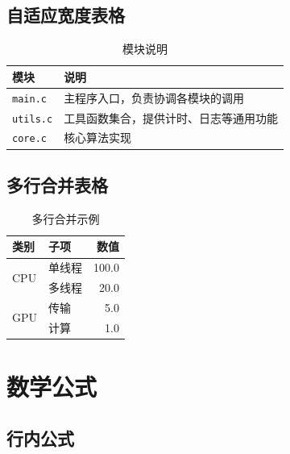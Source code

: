 \subsection{自适应宽度表格}

\begin{table}[H]
    \centering
    \caption{模块说明}
    \label{tab:modules}
    \begin{tabularx}{\textwidth}{lY}
        \toprule
        \textbf{模块} & \textbf{说明} \\
        \midrule
        \texttt{main.c}   & 主程序入口，负责协调各模块的调用 \\
        \texttt{utils.c}   & 工具函数集合，提供计时、日志等通用功能 \\
        \texttt{core.c}    & 核心算法实现 \\
        \bottomrule
    \end{tabularx}
\end{table}

\subsection{多行合并表格}

\begin{table}[H]
    \centering
    \caption{多行合并示例}
    \label{tab:multirow}
    \begin{tabular}{llr}
        \toprule
        \textbf{类别} & \textbf{子项} & \textbf{数值} \\
        \midrule
        \multirow{2}{*}{CPU} & 单线程 & 100.0 \\
                             & 多线程 & 20.0  \\
        \midrule
        \multirow{2}{*}{GPU} & 传输   & 5.0   \\
                             & 计算   & 1.0   \\
        \bottomrule
    \end{tabular}
\end{table}

\section{数学公式}

\subsection{行内公式}

